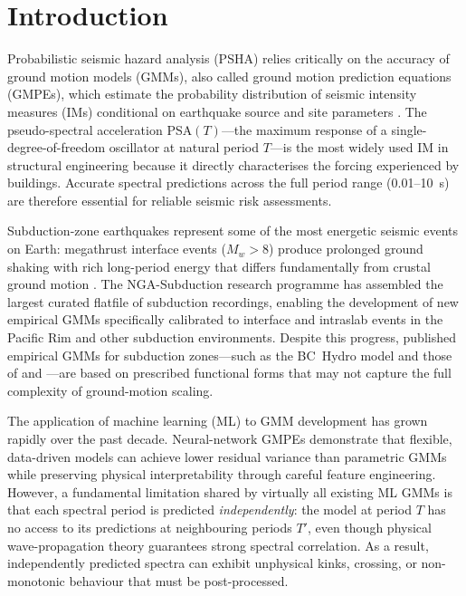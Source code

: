 \documentclass[12pt,a4paper]{article}
\begin{document}
\section{Introduction}
\label{sec:intro}

Probabilistic seismic hazard analysis (PSHA) relies critically on the accuracy
of ground motion models (GMMs), also called ground motion prediction equations
(GMPEs), which estimate the probability distribution of seismic intensity
measures (IMs) conditional on earthquake source and site parameters
\citep{Cornell1968,McGuire2004}.
The pseudo-spectral acceleration PSA$(T)$---the maximum response of a
single-degree-of-freedom oscillator at natural period $T$---is the most
widely used IM in structural engineering because it directly characterises the
forcing experienced by buildings.
Accurate spectral predictions across the full period range (0.01--10~s) are
therefore essential for reliable seismic risk assessments.

Subduction-zone earthquakes represent some of the most energetic seismic events
on Earth: megathrust interface events ($M_w > 8$) produce prolonged ground
shaking with rich long-period energy that differs fundamentally from crustal
ground motion \citep{Zhao2006,Abrahamson2016}.
The NGA-Subduction research programme \citep{Bozorgnia2014} has assembled the
largest curated flatfile of subduction recordings, enabling the development of
new empirical GMMs specifically calibrated to interface and intraslab events in
the Pacific Rim and other subduction environments.
Despite this progress, published empirical GMMs for subduction zones---such as
the BC~Hydro model \citep{Abrahamson2016} and those of \citet{Zhao2006} and
\citet{Atkinson2003}---are based on prescribed functional forms that may not
capture the full complexity of ground-motion scaling.

The application of machine learning (ML) to GMM development has grown rapidly
over the past decade.
Neural-network GMPEs \citep{Derras2014,Derras2016,Sahakian2018,
Khosravikia2021,Kuehn2015} demonstrate that flexible, data-driven models can
achieve lower residual variance than parametric GMMs while preserving physical
interpretability through careful feature engineering.
However, a fundamental limitation shared by virtually all existing ML GMMs is
that each spectral period is predicted \emph{independently}: the model at
period $T$ has no access to its predictions at neighbouring periods $T'$,
even though physical wave-propagation theory guarantees strong spectral
correlation.
As a result, independently predicted spectra can exhibit unphysical kinks,
crossing, or non-monotonic behaviour that must be post-processed.
\end{document}
